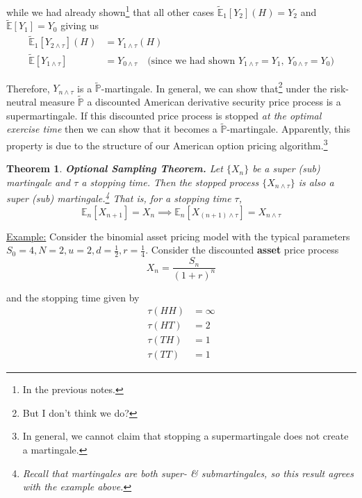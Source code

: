 \documentclass[12pt]{article}
\newtheorem{theorem}{Theorem}
\newlength\tindent
\renewcommand{\indent}{\hspace*{\tindent}}
\renewcommand{\P}{\mathbb P}
\newcommand{\E}{\mathbb E}
\begin{document}
while we had already shown\footnote{In the previous notes.} that all other cases $\tilde{\E}_1\left[ Y_2 \right](H) = Y_2$ and $\tilde{\E}\left[Y_1\right] = Y_0$ giving us
\begin{align*}
	\tilde{\E}_1\left[Y_{2\land\tau}\right](H) &= Y_{1\land\tau}(H) \\
	\tilde{\E}\left[Y_{1\land\tau}\right] &= Y_{0\land\tau} \quad \text{(since we had shown $Y_{1\land\tau} = Y_1,~Y_{0\land\tau} = Y_0$)}
\end{align*}

\indent Therefore, $Y_{n\land\tau}$ is a $\tilde{\P}$-martingale. In general, we can show that\footnote{But I don't think we do?} under the risk-neutral measure $\tilde{\P}$ a discounted American derivative security price process is a supermartingale. If this discounted price process is stopped {\em at the optimal exercise time} then we can show that it becomes a $\tilde{\P}$-martingale. Apparently, this property is due to the structure of our American option pricing algorithm.\footnote{In general, we cannot claim that stopping a supermartingale does not create a martingale.}

\begin{theorem} {\bf Optional Sampling Theorem.} Let $\{X_n\}$ be a super (sub) martingale and $\tau$ a stopping time. Then the stopped process $\{X_{n\land\tau}\}$ is also a super (sub) martingale.\footnote{Recall that martingales are both super- \& submartingales, so this result agrees with the example above.} That is, for a stopping time $\tau$,
\begin{equation*}
	\E_n[X_{n + 1}] = X_n \implies \E_n[X_{(n + 1)\land\tau}] = X_{n\land\tau}
\end{equation*}
\end{theorem}

\underline{Example:} Consider the binomial asset pricing model with the typical parameters $S_0 = 4, N = 2, u = 2, d = \frac{1}{2}, r = \frac{1}{4}$. Consider the discounted {\bf asset} price process
\begin{equation*}
	X_n = \frac{S_n}{(1 + r)^n}
\end{equation*}

and the stopping time given by
\begin{align*}
	\tau(HH) &= \infty \\
	\tau(HT) &= 2 \\
	\tau(TH) &= 1 \\
	\tau(TT) &= 1
\end{align*}
\end{document}
